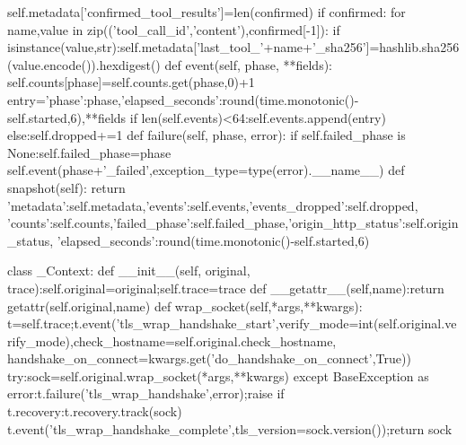             self.metadata['confirmed_tool_results']=len(confirmed)
            if confirmed:
                for name,value in zip(('tool_call_id','content'),confirmed[-1]):
                    if isinstance(value,str):self.metadata['last_tool_'+name+'_sha256']=hashlib.sha256(value.encode()).hexdigest()
    def event(self, phase, **fields):
        self.counts[phase]=self.counts.get(phase,0)+1
        entry={'phase':phase,'elapsed_seconds':round(time.monotonic()-self.started,6),**fields}
        if len(self.events)<64:self.events.append(entry)
        else:self.dropped+=1
    def failure(self, phase, error):
        if self.failed_phase is None:self.failed_phase=phase
        self.event(phase+'_failed',exception_type=type(error).__name__)
    def snapshot(self):
        return {'metadata':self.metadata,'events':self.events,'events_dropped':self.dropped,
            'counts':self.counts,'failed_phase':self.failed_phase,'origin_http_status':self.origin_status,
            'elapsed_seconds':round(time.monotonic()-self.started,6)}

class _Context:
    def __init__(self, original, trace):self.original=original;self.trace=trace
    def __getattr__(self,name):return getattr(self.original,name)
    def wrap_socket(self,*args,**kwargs):
        t=self.trace;t.event('tls_wrap_handshake_start',verify_mode=int(self.original.verify_mode),check_hostname=self.original.check_hostname,
            handshake_on_connect=kwargs.get('do_handshake_on_connect',True))
        try:sock=self.original.wrap_socket(*args,**kwargs)
        except BaseException as error:t.failure('tls_wrap_handshake',error);raise
        if t.recovery:t.recovery.track(sock)
        t.event('tls_wrap_handshake_complete',tls_version=sock.version());return sock

